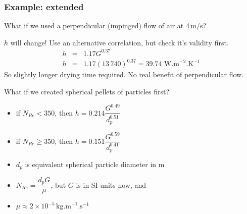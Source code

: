 \begin{frame}\frametitle{Example: extended}
	{\color{myGreen}What if we used a perpendicular (impinged) flow of air at 4\,m/s?}

	\vspace{12pt}
	$h$ will change! Use an alternative correlation, but check it's validity first.
	\[
		\begin{array}{rcl}
			h &=& 1.17G^{0.37}\\
			h &=& 1.17(13\,740)^{0.37} = 39.74 \,\,\text{W.m}^{-2}\text{.K}^{-1}
		\end{array}
	\]
	So slightly longer drying time required. No real benefit of perpendicular flow.

	\vspace{12pt}
	{\color{myGreen}What if we created spherical pellets of particles first?}
	\begin{itemize}
		\item	if $N_{Re}<350$, then $h = 0.214 \dfrac{G^{0.49}}{d_p^{0.51}}$
		\item	if $N_{Re}\geq 350$, then $h = 0.151 \dfrac{G^{0.59}}{d_p^{0.41}}$
		\item	$d_p$ is equivalent spherical particle diameter in m
		\item	$N_{Re} = \dfrac{d_p G}{\mu}$, but $G$ is in SI units now, and
		\item	$\mu \approx 2 \times 10^{-5}\,\text{kg.m}^{-1}\text{.s}^{-1}$
	\end{itemize}
\end{frame}